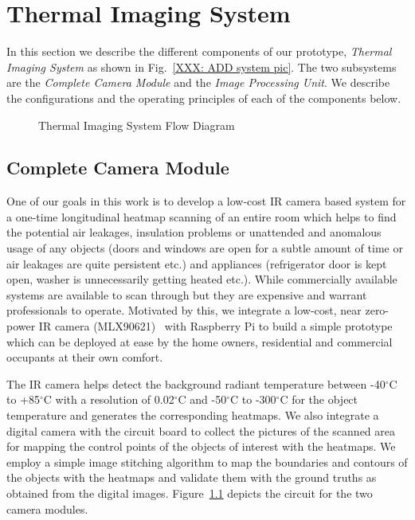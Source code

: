 \section{Thermal Imaging System}
In this section we describe the different components of our prototype, {\it Thermal Imaging System} as shown in Fig.~\ref{XXX: ADD system pic}. The two subsystems are the {\it Complete Camera Module} and the {\it Image Processing Unit}. We describe the configurations and the operating principles of each of the components below.
	\begin{figure}[!htb]
\begin{center}
 \caption{Thermal Imaging System Flow Diagram}
 \label{fig:Flow}
\end{center}
\end{figure}
	
	
\subsection{Complete Camera Module}
One of our goals in this work is to develop a low-cost IR camera based system for a one-time longitudinal heatmap scanning of an entire room which helps to find the potential air leakages, insulation problems or unattended and anomalous usage of any objects (doors and windows are open for a subtle amount of time or air leakages are quite persistent etc.) and appliances (refrigerator door is kept open, washer is unnecessarily getting heated etc.). While commercially available systems are available to scan through but they are expensive and warrant professionals to operate. Motivated by this, we integrate a low-cost, near zero-power IR camera (MLX90621)~\cite{} with Raspberry Pi to build a simple prototype which can be deployed at ease by the home owners, residential and commercial occupants at their own comfort. 

The IR camera helps detect the background radiant temperature between -40$^{\circ}$C to +85$^{\circ}$C with a resolution of 0.02$^{\circ}$C and -50$^{\circ}$C to -300$^{\circ}$C for the object temperature and generates the corresponding heatmaps. We also integrate a digital camera with the circuit board to collect the  pictures of the scanned area for mapping the control points of the objects of interest with the heatmaps. We employ a simple image stitching algorithm to map the boundaries and contours of the objects with the heatmaps and validate them with the ground truths as obtained from the digital images. Figure~\ref{} depicts the circuit for the two camera modules.
	

